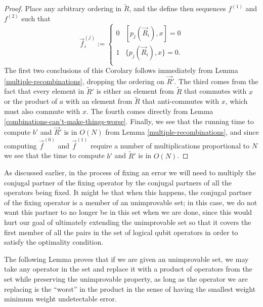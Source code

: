 \documentclass[twocolumn,showpacs,preprintnumbers,amsmath,amssymb,nofootinbib,pra,floatfix]{revtex4-1}
\newenvironment{remark}[1][Remark]{\begin{trivlist}
\item[\hskip \labelsep {\bfseries #1}]}{\end{trivlist}}
\newcommand{\lst}{\vec}
\newcommand{\set}{\tilde}
\begin{document}
\begin{proof}
Place any arbitrary ordering in $\set R$, and the define then sequences $f^{(1)}$ and $f^{(2)}$ such that
$$\lst f^{(j)}_i :=
\begin{cases}
0 & [p_j(\lst R_i),x] = 0 \\
1 & \{p_j(\lst R_i),x\} = 0. \\
\end{cases}
$$
The first two conclusions of this Corolary follows immediately from Lemma \ref{multiple-recombinations}, dropping the ordering on $\lst R'$.  The third comes from the fact that every element in $\set R'$ is either an element from $\set R$ that commutes with $x$ or the product of $a$ with an element from $\set R$ that anti-commutes with $x$, which must also commute with $x$.  The fourth comes directly from Lemma \ref{combinations-can't-make-things-worse}.
Finally, we see that the running time to compute $b'$ and $\lst R'$ is in $O(N)$ from Lemma \ref{multiple-recombinations}, and since computing $\lst f^{(0)}$ and $\lst f^{(1)}$ require a number of multiplications proportional to $N$ we see that the time to compute $b'$ and $\set R'$ is in $O(N)$.
\end{proof}
\begin{remark}
As discussed earlier, in the process of fixing an error we will need to multiply the conjugal partner of the fixing operator by the conjugal partners of all the operators being fixed.  It might be that when this happens, the conjugal partner of the fixing operator is a member of an unimprovable set;  in this case, we do not want this partner to no longer be in this set when we are done, since this would hurt our goal of ultimately extending the unimprovable set so that it covers the first member of all the pairs in the set of logical qubit operators in order to satisfy the optimality condition.

The following Lemma proves that if we are given an unimprovable set, we may take any operator in the set and replace it with a product of operators from the set while preserving the unimprovable property, as long as the operator we are replacing is the ``worst'' in the product in the sense of having the smallest weight minimum weight undetectable error.
\end{remark}
\end{document}
